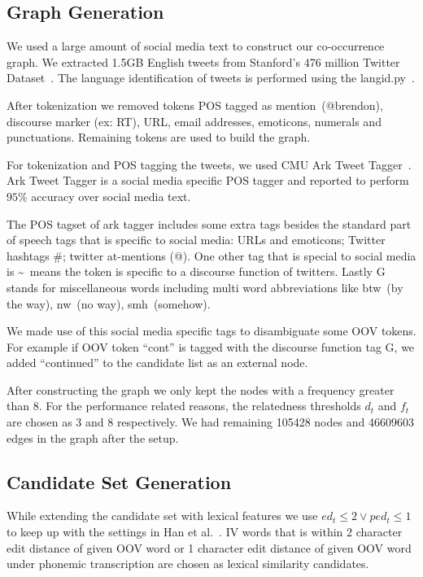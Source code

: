 \documentclass[preprint,review,12pt]{elsarticle}
\begin{document}
\subsection{Graph Generation}
We used a large amount of social media text to construct our co-occurrence graph. We extracted 1.5GB English tweets from Stanford's 476 million Twitter Dataset~\cite{DBLP:conf/wsdm/YangL11}. The language identification of tweets is performed using the langid.py~\cite{Lui:2012:LOL:2390470.2390475, Baldwin:2010:LIL:1857999.1858026}.

After tokenization we removed tokens POS tagged as mention~(@brendon), discourse marker (ex: RT), URL, email addresses, emoticons, numerals and punctuations. Remaining tokens are used to build the graph.

For tokenization and POS tagging the tweets, we used CMU Ark Tweet Tagger~\cite{DBLP:conf/naacl/OwoputiODGSS13,Gimpel:2011:PTT:2002736.2002747}. Ark Tweet Tagger is a social media specific POS tagger and reported to perform $95\%$ accuracy over social media text.

The POS tagset of ark tagger includes some extra tags besides the standard part of speech tags that is specific to social media: URLs and emoticons; Twitter hashtags \#; twitter at-mentions (@). One other tag that is special to social media is \textasciitilde~means the token is specific to a discourse function of twitters. Lastly G stands for miscellaneous words including multi word abbreviations like btw~(by the way), nw~(no way), smh~(somehow).

We made use of this social media specific tags to disambiguate some OOV tokens. For example if OOV token ``cont'' is tagged with the discourse function tag G, we added ``continued'' to the candidate list as an external node.

After constructing the graph we only kept the nodes with a frequency greater than 8. For the performance related reasons, the relatedness thresholds $d_t$ and $f_t$  are chosen as 3 and 8 respectively. We had remaining 105428 nodes and 46609603 edges in the graph after the setup.

\subsection{Candidate Set Generation}

While extending the candidate set with lexical features we use ${ed_t \leq 2} \vee {ped_t \leq 1}$ to keep up with the settings in Han et al.~\cite{Han:2011:LNS:2002472.2002520}. IV words that is within 2 character edit distance of given OOV word or 1 character edit distance of given OOV word under phonemic transcription are chosen as lexical similarity candidates.
\end{document}
